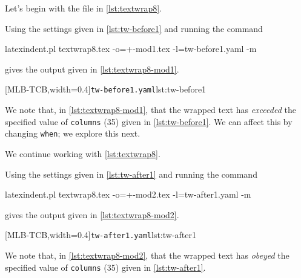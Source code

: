  \begin{example}
 Let's begin with the file in \cref{lst:textwrap8}.


 Using the settings given in \cref{lst:tw-before1} and running the command

 \begin{commandshell}
latexindent.pl textwrap8.tex -o=+-mod1.tex -l=tw-before1.yaml -m
   \end{commandshell}

 gives the output given in \cref{lst:textwrap8-mod1}.

 \begin{cmhtcbraster}[raster columns=2,
   raster left skip=-1.5cm,
   raster right skip=-0cm,
   raster column skip=.06\linewidth]
  [MLB-TCB,width=0.4\linewidth]{\texttt{tw-before1.yaml}}{lst:tw-before1}
 \end{cmhtcbraster}

 We note that, in \cref{lst:textwrap8-mod1}, that the wrapped text has \emph{exceeded}
 the specified value of \texttt{columns} (35) given in \cref{lst:tw-before1}. We can
 affect this by changing \texttt{when}; we explore this next.
 \end{example}

 \begin{example}
 We continue working with \cref{lst:textwrap8}.

 Using the settings given in \cref{lst:tw-after1} and running the command

 \begin{commandshell}
latexindent.pl textwrap8.tex -o=+-mod2.tex -l=tw-after1.yaml -m
   \end{commandshell}

 gives the output given in \cref{lst:textwrap8-mod2}.

 \begin{cmhtcbraster}[raster columns=2,
   raster left skip=-1.5cm,
   raster right skip=-0cm,
   raster column skip=.06\linewidth]
  [MLB-TCB,width=0.4\linewidth]{\texttt{tw-after1.yaml}}{lst:tw-after1}
 \end{cmhtcbraster}

 We note that, in \cref{lst:textwrap8-mod2}, that the wrapped text has \emph{obeyed} the
 specified value of \texttt{columns} (35) given in \cref{lst:tw-after1}.
 \end{example}

